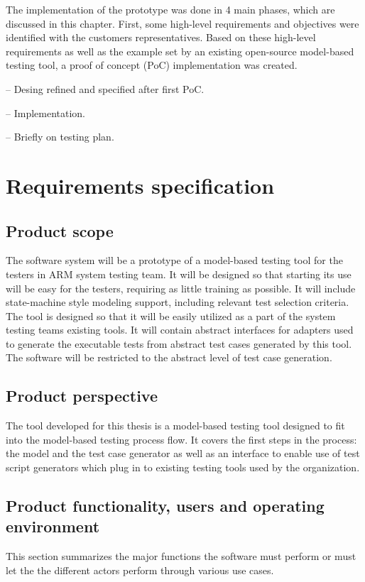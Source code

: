 The implementation of the prototype was done in 4 main phases, which are discussed in this chapter. First, some high-level requirements and objectives were identified with the customers representatives. Based on these high-level requirements as well as the example set by an existing open-source model-based testing tool, a proof of concept (PoC) implementation was created.


-- Desing refined and specified after first PoC.

-- Implementation.

-- Briefly on testing plan.


\section{Requirements specification}

\subsection{Product scope}
The software system will be a prototype of a model-based testing tool for the testers in ARM system testing team. It will be designed so that starting its use will be easy for the testers, requiring as little training as possible. It will include state-machine style modeling support, including relevant test selection criteria. 
The tool is designed so that it will be easily utilized as a part of the system testing teams existing tools. It will contain abstract interfaces for adapters used to generate the executable tests from abstract test cases generated by this tool. The software will be restricted to the abstract level of test case generation.

\subsection{Product perspective}
The tool developed for this thesis is a model-based testing tool designed to fit into the model-based testing process flow. It covers the first steps in the process: the model and the test case generator as well as an interface to enable use of test script generators which plug in to existing testing tools used by the organization.

\subsection{Product functionality, users and operating environment}
This section summarizes the major functions the software must perform or must let the the different actors perform through various use cases.

